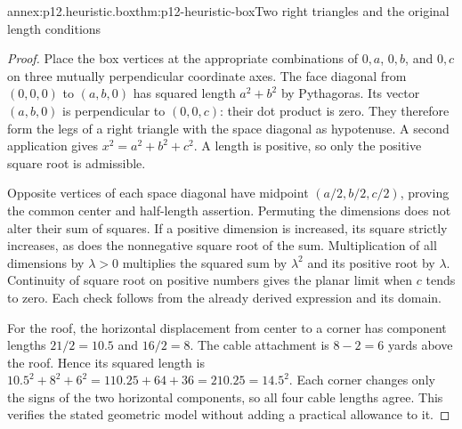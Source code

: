\begin{annexitem}{annex:p12.heuristic.box}{thm:p12-heuristic-box}{Two right triangles and the original length conditions}
\begin{proof}
Place the box vertices at the appropriate combinations of
\(0,a\), \(0,b\), and \(0,c\) on three mutually perpendicular
coordinate axes. The face diagonal from \((0,0,0)\) to
\((a,b,0)\) has squared length \(a^2+b^2\) by Pythagoras.
Its vector \((a,b,0)\) is perpendicular to \((0,0,c)\):
their dot product is zero. They therefore form the legs of a
right triangle with the space diagonal as hypotenuse. A second
application gives \(x^2=a^2+b^2+c^2\). A length is positive,
so only the positive square root is admissible.

Opposite vertices of each space diagonal have midpoint
\((a/2,b/2,c/2)\), proving the common center and half-length
assertion. Permuting the dimensions does not alter their sum
of squares. If a positive dimension is increased, its square
strictly increases, as does the nonnegative square root of the
sum. Multiplication of all dimensions by \(\lambda>0\) multiplies
the squared sum by \(\lambda^2\) and its positive root by
\(\lambda\). Continuity of square root on positive numbers
gives the planar limit when \(c\) tends to zero. Each check
follows from the already derived expression and its domain.

For the roof, the horizontal displacement from center to a corner
has component lengths \(21/2=10.5\) and \(16/2=8\). The cable
attachment is \(8-2=6\) yards above the roof. Hence its squared
length is
\(10.5^2+8^2+6^2=110.25+64+36=210.25=14.5^2\).
Each corner changes only the signs of the two horizontal
components, so all four cable lengths agree. This verifies the
stated geometric model without adding a practical allowance to it.
\end{proof}
\end{annexitem}

